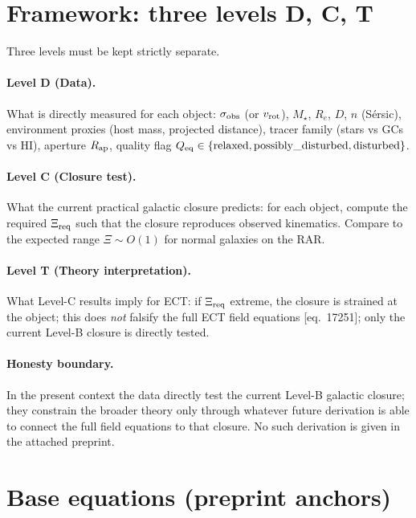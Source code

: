 \documentclass[11pt]{article}
\begin{document}
\section{Framework: three levels D, C, T}

Three levels must be kept strictly separate.

\paragraph{Level D (Data).} What is directly measured for each object:
$\sigma_{\rm obs}$ (or $v_{\rm rot}$), $M_\star$, $R_e$, $D$, $n$
(S\'ersic), environment proxies (host mass, projected distance), tracer
family (stars vs GCs vs HI), aperture $R_{\rm ap}$, quality flag
$Q_{\rm eq}\in\{{\rm relaxed, possibly\_disturbed, disturbed}\}$.

\paragraph{Level C (Closure test).} What the current practical galactic
closure predicts: for each object, compute the required $\Xi_{\rm req}$
such that the closure reproduces observed kinematics. Compare to the
expected range $\Xi\sim O(1)$ for normal galaxies on the RAR.

\paragraph{Level T (Theory interpretation).} What Level-C results imply
for ECT: if $\Xi_{\rm req}$ extreme, the closure is strained at the
object; this does \emph{not} falsify the full ECT field equations
[eq.~17251]; only the current Level-B closure is directly tested.

\paragraph{Honesty boundary.} In the present context the data directly
test the current Level-B galactic closure; they constrain the broader
theory only through whatever future derivation is able to connect the
full field equations to that closure. No such derivation is given in
the attached preprint.

\section{Base equations (preprint anchors)}
\end{document}
